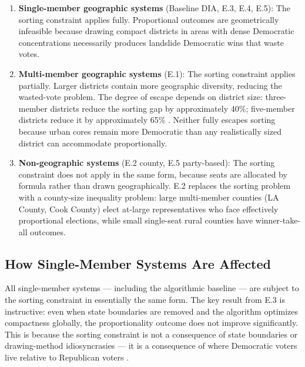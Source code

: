 \begin{enumerate}
  \item \textbf{Single-member geographic systems} (Baseline DIA, E.3, E.4, E.5):
        The sorting constraint applies fully.  Proportional outcomes are
        geometrically infeasible because drawing compact districts in areas with
        dense Democratic concentrations necessarily produces landslide Democratic
        wins that waste votes.

  \item \textbf{Multi-member geographic systems} (E.1):
        The sorting constraint applies partially.  Larger districts contain more
        geographic diversity, reducing the wasted-vote problem.  The degree of
        escape depends on district size: three-member districts reduce the
        sorting gap by approximately 40\%; five-member districts reduce it by
        approximately 65\% \citep{dellaLibera2026e1}.  Neither fully escapes
        sorting because urban cores remain more Democratic than any realistically
        sized district can accommodate proportionally.

  \item \textbf{Non-geographic systems} (E.2 county, E.5 party-based):
        The sorting constraint does not apply in the same form, because seats
        are allocated by formula rather than drawn geographically.  E.2 replaces
        the sorting problem with a county-size inequality problem: large
        multi-member counties (LA County, Cook County) elect at-large
        representatives who face effectively proportional elections, while small
        single-seat rural counties have winner-take-all outcomes.

\end{enumerate}

\subsection{How Single-Member Systems Are Affected}

All single-member systems --- including the algorithmic baseline --- are subject
to the sorting constraint in essentially the same form.  The key result from E.3
is instructive: even when state boundaries are removed and the algorithm
optimizes compactness globally, the proportionality outcome does not improve
significantly.  This is because the sorting constraint is not a consequence of
state boundaries or drawing-method idiosyncrasies --- it is a consequence of
where Democratic voters live relative to Republican voters \citep{rodden2019why}.

